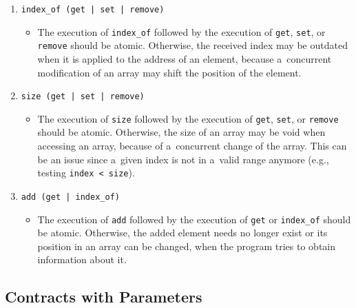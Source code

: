 \begin{example}
\begin{enumerate}[label={$ (\varrho_{\arabic*}) $}]
        \item
            \texttt{index\_of (get | set | remove)}
            \begin{itemize}[label=]
                \item
                    The execution of \texttt{index\_of} followed by the
                    execution of \texttt{get}, \texttt{set}, or
                    \texttt{remove} should be atomic. Otherwise, the received
                    index may be outdated when it is applied to the address
                    of an element, because a~concurrent modification of an
                    array may shift the position of the element.
            \end{itemize}

        \item
            \texttt{size (get | set | remove)}
            \begin{itemize}[label=]
                \item
                    The execution of \texttt{size} followed by the execution of
                    \texttt{get}, \texttt{set}, or \texttt{remove} should be
                    atomic. Otherwise, the size of an array may be void when
                    accessing an array, because of a~concurrent change of the
                    array. This can be an issue since a~given index is not in
                    a~valid range anymore (e.g., testing \texttt{index < size}).
            \end{itemize}

        \item
            \texttt{add (get | index\_of)}
            \begin{itemize}[label=]
                \item
                    The execution of \texttt{add} followed by the execution of
                    \texttt{get} or \texttt{index\_of} should be atomic.
                    Otherwise, the added element needs no longer exist or its
                    position in an array can be changed, when the program
                    tries to obtain information about it.
            \end{itemize}
    \end{enumerate}
\end{example}


\subsection{Contracts with Parameters}
\label{sec:paramContracts}

